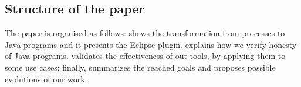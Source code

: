 \subsection*{Structure of the paper}

The paper is organised as follows: 
 shows the transformation from \coco processes to Java programs and it presents the \coco Eclipse plugin.
 explains how we verify honesty of Java programs. 
 validates the effectiveness of out tools, by applying them to some use cases; finally,  summarizes the reached goals and proposes possible evolutions of our work.